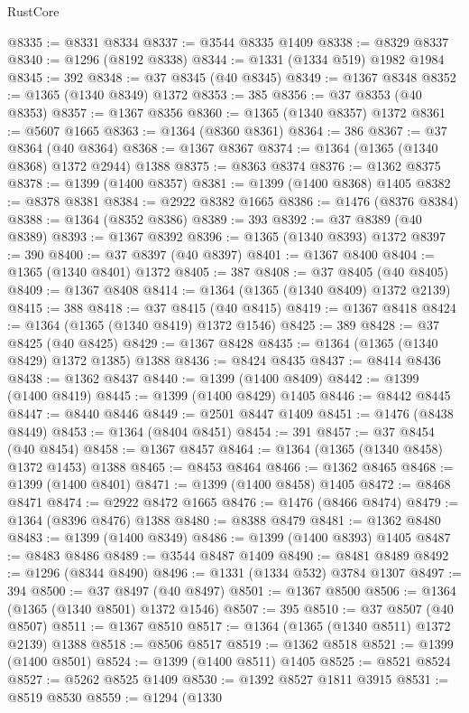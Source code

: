 \begin{lexlean}{RustCore}
\begin{coremodule}
@8335 := @8331 @8334
@8337 := @3544 @8335 @1409
@8338 := @8329 @8337
@8340 := @1296 (@8192 @8338)
@8344 := @1331 (@1334 @519) @1982 @1984
@8345 := 392
@8348 := @37 @8345 (@40 @8345)
@8349 := @1367 @8348
@8352 := @1365 (@1340 @8349) @1372
@8353 := 385
@8356 := @37 @8353 (@40 @8353)
@8357 := @1367 @8356
@8360 := @1365 (@1340 @8357) @1372
@8361 := @5607 @1665
@8363 := @1364 (@8360 @8361)
@8364 := 386
@8367 := @37 @8364 (@40 @8364)
@8368 := @1367 @8367
@8374 := @1364 (@1365 (@1340 @8368) @1372 @2944) @1388
@8375 := @8363 @8374
@8376 := @1362 @8375
@8378 := @1399 (@1400 @8357)
@8381 := @1399 (@1400 @8368) @1405
@8382 := @8378 @8381
@8384 := @2922 @8382 @1665
@8386 := @1476 (@8376 @8384)
@8388 := @1364 (@8352 @8386)
@8389 := 393
@8392 := @37 @8389 (@40 @8389)
@8393 := @1367 @8392
@8396 := @1365 (@1340 @8393) @1372
@8397 := 390
@8400 := @37 @8397 (@40 @8397)
@8401 := @1367 @8400
@8404 := @1365 (@1340 @8401) @1372
@8405 := 387
@8408 := @37 @8405 (@40 @8405)
@8409 := @1367 @8408
@8414 := @1364 (@1365 (@1340 @8409) @1372 @2139)
@8415 := 388
@8418 := @37 @8415 (@40 @8415)
@8419 := @1367 @8418
@8424 := @1364 (@1365 (@1340 @8419) @1372 @1546)
@8425 := 389
@8428 := @37 @8425 (@40 @8425)
@8429 := @1367 @8428
@8435 := @1364 (@1365 (@1340 @8429) @1372 @1385) @1388
@8436 := @8424 @8435
@8437 := @8414 @8436
@8438 := @1362 @8437
@8440 := @1399 (@1400 @8409)
@8442 := @1399 (@1400 @8419)
@8445 := @1399 (@1400 @8429) @1405
@8446 := @8442 @8445
@8447 := @8440 @8446
@8449 := @2501 @8447 @1409
@8451 := @1476 (@8438 @8449)
@8453 := @1364 (@8404 @8451)
@8454 := 391
@8457 := @37 @8454 (@40 @8454)
@8458 := @1367 @8457
@8464 := @1364 (@1365 (@1340 @8458) @1372 @1453) @1388
@8465 := @8453 @8464
@8466 := @1362 @8465
@8468 := @1399 (@1400 @8401)
@8471 := @1399 (@1400 @8458) @1405
@8472 := @8468 @8471
@8474 := @2922 @8472 @1665
@8476 := @1476 (@8466 @8474)
@8479 := @1364 (@8396 @8476) @1388
@8480 := @8388 @8479
@8481 := @1362 @8480
@8483 := @1399 (@1400 @8349)
@8486 := @1399 (@1400 @8393) @1405
@8487 := @8483 @8486
@8489 := @3544 @8487 @1409
@8490 := @8481 @8489
@8492 := @1296 (@8344 @8490)
@8496 := @1331 (@1334 @532) @3784 @1307
@8497 := 394
@8500 := @37 @8497 (@40 @8497)
@8501 := @1367 @8500
@8506 := @1364 (@1365 (@1340 @8501) @1372 @1546)
@8507 := 395
@8510 := @37 @8507 (@40 @8507)
@8511 := @1367 @8510
@8517 := @1364 (@1365 (@1340 @8511) @1372 @2139) @1388
@8518 := @8506 @8517
@8519 := @1362 @8518
@8521 := @1399 (@1400 @8501)
@8524 := @1399 (@1400 @8511) @1405
@8525 := @8521 @8524
@8527 := @5262 @8525 @1409
@8530 := @1392 @8527 @1811 @3915
@8531 := @8519 @8530
@8559 := @1294
    (@1330

\end{coremodule}
\end{lexlean}
